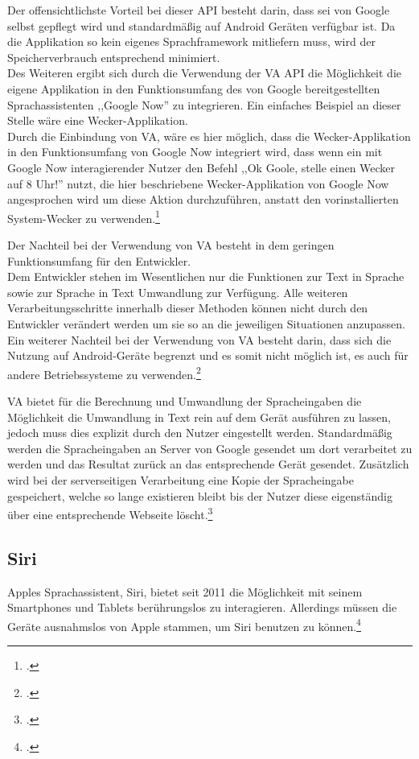 Der offensichtlichste Vorteil bei dieser \ac{API} besteht darin, dass sei von Google selbst gepflegt wird und standardmäßig auf Android Geräten verfügbar ist. Da die Applikation so kein eigenes Sprachframework mitliefern muss, wird der Speicherverbrauch entsprechend minimiert.\\
Des Weiteren ergibt sich durch die Verwendung der \ac{VA} \ac{API} die Möglichkeit die eigene Applikation in den Funktionsumfang des von Google bereitgestellten Sprachassistenten ,,Google Now'' zu integrieren. Ein einfaches Beispiel an dieser Stelle wäre eine Wecker-Applikation.\\
Durch die Einbindung von \ac{VA}, wäre es hier möglich, dass die Wecker-Applikation in den Funktionsumfang von Google Now integriert wird, dass wenn ein mit Google Now interagierender Nutzer den Befehl ,,Ok Goole, stelle einen Wecker auf 8 Uhr!'' nutzt, die hier beschriebene Wecker-Applikation von Google Now angesprochen wird um diese Aktion durchzuführen, anstatt den vorinstallierten System-Wecker zu verwenden.\footcite[vgl.:][]{voiceActions}

Der Nachteil bei der Verwendung von \ac{VA} besteht in dem geringen Funktionsumfang für den Entwickler.\\
Dem Entwickler stehen im Wesentlichen nur die Funktionen zur Text in Sprache sowie zur Sprache in Text Umwandlung zur Verfügung. Alle weiteren Verarbeitungsschritte innerhalb dieser Methoden können nicht durch den Entwickler verändert werden um sie so an die jeweiligen Situationen anzupassen.\\
Ein weiterer Nachteil bei der Verwendung von \ac{VA} besteht darin, dass sich die Nutzung auf Android-Geräte begrenzt und es somit nicht möglich ist, es auch für andere Betriebssysteme zu verwenden.\footcite[vgl.:][]{voiceActions}

\ac{VA} bietet für die Berechnung und Umwandlung der Spracheingaben die Möglichkeit die Umwandlung in Text rein auf dem Gerät ausführen zu lassen, jedoch muss dies explizit durch den Nutzer eingestellt werden. Standardmäßig werden die Spracheingaben an Server von Google gesendet um dort verarbeitet zu werden und das Resultat zurück an das entsprechende Gerät gesendet. Zusätzlich wird bei der serverseitigen Verarbeitung eine Kopie der Spracheingabe gespeichert, welche so lange existieren bleibt bis der Nutzer diese eigenständig über eine entsprechende Webseite löscht.\footcite[vgl.:][]{voiceActions}

\subsection{Siri}
Apples Sprachassistent, Siri, bietet seit 2011 die Möglichkeit mit seinem Smartphones und Tablets berührungslos zu interagieren. Allerdings müssen die Geräte ausnahmslos von Apple stammen, um Siri benutzen zu können.\footcite[vgl.:][]{Siriexplained} 

